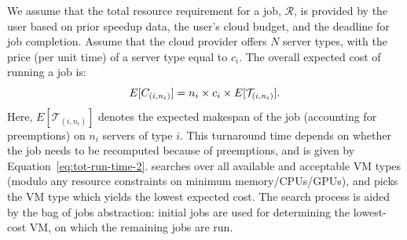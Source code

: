 We assume that the total resource requirement for a job, $\mathcal{R}$, is provided by the user based on prior speedup data, the user's cloud budget, and the deadline for job completion.
Assume that the cloud provider offers $N$ server types, with the price (per unit time) of a server type equal to $c_i$. 
The overall expected cost of running a job is: 
\begin{equation}
  \label{eq:e-cost}
\vspace*{\eqnspace}
  E[C_{( i,n_i )}] = n_i\times c_i \times E[\mathcal{T}_{( i,n_i )}].
\end{equation}
Here, $E[\mathcal{T}_{( i,n_i )}]$ denotes the expected makespan of the job (accounting for preemptions) on $n_i$ servers of type $i$. 
%
This turnaround time depends on whether the job needs to be recomputed because of preemptions, and is given by Equation~\ref{eq:tot-run-time-2}. 
%
\sysname searches over all available and acceptable VM types (modulo any resource constraints on minimum memory/CPUs/GPUs), and picks the VM type which yields the lowest expected cost.
The search process is aided by the bag of jobs abstraction: initial jobs are used for determining the lowest-cost VM, on which the remaining jobs are run. 









